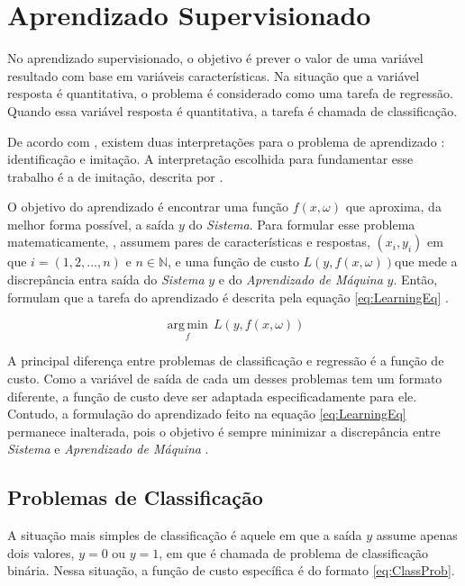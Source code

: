 \section{Aprendizado Supervisionado}

No aprendizado supervisionado, o objetivo é prever o valor de uma variável resultado com base em variáveis características. Na situação que a variável resposta é quantitativa, o problema é considerado como uma tarefa de regressão. Quando essa variável resposta é quantitativa, a tarefa é chamada de classificação.

De acordo com , existem duas interpretações para o problema de aprendizado : identificação e imitação. A interpretação escolhida para fundamentar esse trabalho é a de imitação, descrita por .

O objetivo do aprendizado é encontrar uma função $f(x, \omega)$ que aproxima, da melhor forma possível, a saída $y$ do \textit{Sistema}. Para formular esse problema matematicamente, , assumem pares de características e respostas, $(x_i, y_i)$ em que $i = (1, 2, ..., n)$ e $ n \in \mathbb {N}$, e uma função de custo $L(y, f(x, \omega))$que mede a discrepância entra saída do \textit{Sistema} $y$ e do \textit{Aprendizado de Máquina} $\hat{y}$. Então, formulam que a tarefa do aprendizado é descrita pela equação \ref{eq:LearningEq} . 

\begin{equation}
{	
	{\displaystyle {\underset {f}{\operatorname {arg\,min} }}\, L(y, f(x, \omega))}
}
\label{eq:LearningEq}
\end{equation}

A principal diferença entre problemas de classificação e regressão é a função de custo. Como a variável de saída de cada um desses problemas tem um formato diferente, a função de custo deve ser adaptada especificadamente para ele. Contudo, a formulação do aprendizado feito na equação \ref{eq:LearningEq} permanece inalterada, pois o objetivo é sempre minimizar a discrepância entre \textit{Sistema} e \textit{Aprendizado de Máquina} \cite{Cherkassky2007}.

\subsection{Problemas de Classificação}
A situação mais simples de classificação é aquele em que a saída $y$ assume apenas dois valores, $y = 0$ ou $y = 1$, em que é chamada de problema de classificação binária. Nessa situação, a função de custo específica é do formato \ref{eq:ClassProb}.

